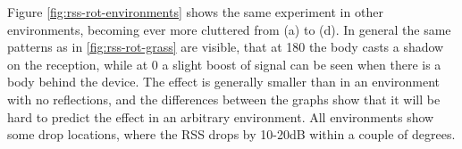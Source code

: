 
Figure \ref{fig:rss-rot-environments} shows the same experiment in other environments, becoming ever more cluttered from (a) to (d).
In general the same patterns as in \ref{fig:rss-rot-grass} are visible, that at 180\textdegree{} the body casts a shadow on the reception, while at 0\textdegree{} a slight boost of signal can be seen when there is a body behind the device.
The effect is generally smaller than in an environment with no reflections, and the differences between the graphs show that it will be hard to predict the effect in an arbitrary environment.
All environments show some drop locations, where the RSS drops by 10-20dB within a couple of degrees.

